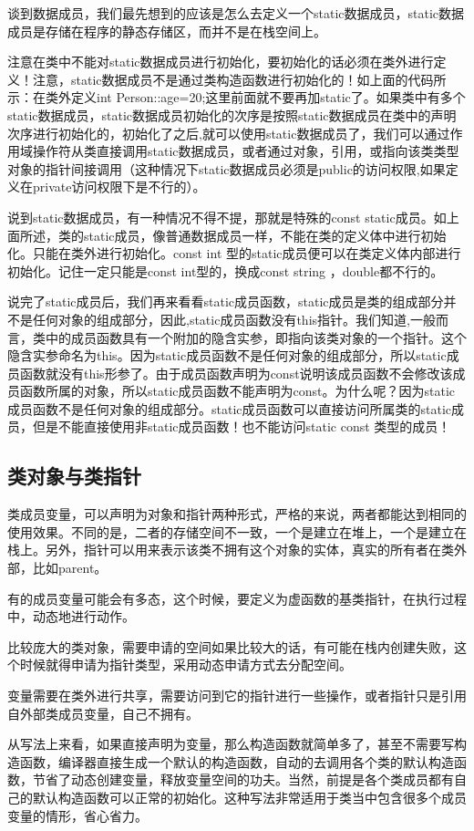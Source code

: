 谈到数据成员，我们最先想到的应该是怎么去定义一个static数据成员，static数据成员是存储在程序的静态存储区，而并不是在栈空间上。

注意在类中不能对static数据成员进行初始化，要初始化的话必须在类外进行定义！注意，static数据成员不是通过类构造函数进行初始化的！如上面的代码所示：在类外定义int Person::age=20;这里前面就不要再加static了。如果类中有多个static数据成员，static数据成员初始化的次序是按照static数据成员在类中的声明次序进行初始化的，初始化了之后,就可以使用static数据成员了，我们可以通过作用域操作符从类直接调用static数据成员，或者通过对象，引用，或指向该类类型对象的指针间接调用（这种情况下static数据成员必须是public的访问权限,如果定义在private访问权限下是不行的）。

说到static数据成员，有一种情况不得不提，那就是特殊的const static成员。如上面所述，类的static成员，像普通数据成员一样，不能在类的定义体中进行初始化。只能在类外进行初始化。const int 型的static成员便可以在类定义体内部进行初始化。记住一定只能是const int型的，换成const string ，double都不行的。

说完了static成员后，我们再来看看static成员函数，static成员是类的组成部分并不是任何对象的组成部分，因此,static成员函数没有this指针。我们知道,一般而言，类中的成员函数具有一个附加的隐含实参，即指向该类对象的一个指针。这个隐含实参命名为this。因为static成员函数不是任何对象的组成部分，所以static成员函数就没有this形参了。由于成员函数声明为const说明该成员函数不会修改该成员函数所属的对象，所以static成员函数不能声明为const。为什么呢？因为static成员函数不是任何对象的组成部分。static成员函数可以直接访问所属类的static成员，但是不能直接使用非static成员函数！也不能访问static const 类型的成员！
\subsection{类对象与类指针}
类成员变量，可以声明为对象和指针两种形式，严格的来说，两者都能达到相同的使用效果。不同的是，二者的存储空间不一致，一个是建立在堆上，一个是建立在栈上。另外，指针可以用来表示该类不拥有这个对象的实体，真实的所有者在类外部，比如parent。

有的成员变量可能会有多态，这个时候，要定义为虚函数的基类指针，在执行过程中，动态地进行动作。

比较庞大的类对象，需要申请的空间如果比较大的话，有可能在栈内创建失败，这个时候就得申请为指针类型，采用动态申请方式去分配空间。

变量需要在类外进行共享，需要访问到它的指针进行一些操作，或者指针只是引用自外部类成员变量，自己不拥有。

从写法上来看，如果直接声明为变量，那么构造函数就简单多了，甚至不需要写构造函数，编译器直接生成一个默认的构造函数，自动的去调用各个类的默认构造函数，节省了动态创建变量，释放变量空间的功夫。当然，前提是各个类成员都有自己的默认构造函数可以正常的初始化。这种写法非常适用于类当中包含很多个成员变量的情形，省心省力。

